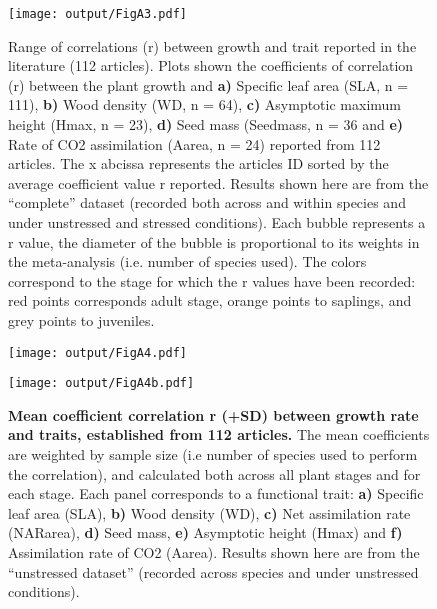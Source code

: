 \documentclass[a4paper]{article}\usepackage[]{graphicx}\usepackage[]{color}
\begin{document}
\begin{appendices}
\begin{figure}[h!]
\centering
\texttt{[image: output/FigA3.pdf]}
\caption{Range of correlations (r) between
growth and trait reported in the literature (112 articles). Plots shown the coefficients of correlation (r)
between the plant growth and \textbf{a)} Specific leaf area (SLA, n =
111), \textbf{b)} Wood density (WD, n = 64), \textbf{c)} Asymptotic
maximum height (Hmax, n = 23), \textbf{d)} Seed mass (Seedmass, n = 36 and
\textbf{e)} Rate of CO2 assimilation (Aarea, n = 24) reported from 112
articles. The x abcissa represents the articles ID sorted by the average coefficient value r reported.
Results shown here are from the ``complete'' dataset (recorded both across and within species
and under unstressed and stressed conditions). Each bubble represents a r value, the diameter of the bubble
is proportional to its weights in the meta-analysis (i.e. number of species used). The colors
correspond to the stage for which the r values have been recorded: red
points corresponds adult stage, orange points to saplings, and grey
points to juveniles.}
\label{fig:figA3}
\end{figure}

\begin{figure}[h!]
\centering
\texttt{[image: output/FigA4.pdf]}
\end{figure}

\begin{figure}[h!]
\centering
\texttt{[image: output/FigA4b.pdf]}
\caption{\textbf{Mean coefficient correlation r (+SD) between growth rate and traits, established from 112 articles.} The mean coefficients are weighted by sample size (i.e number of species used to perform the correlation), and calculated both across all plant stages and for each stage. Each panel corresponds to a functional trait: \textbf{a)} Specific leaf area (SLA), \textbf{b)} Wood density (WD), \textbf{c)} Net assimilation rate (NARarea), \textbf{d)} Seed mass, \textbf{e)} Asymptotic height (Hmax) and \textbf{f)} Assimilation rate of CO2 (Aarea). Results shown here are from the ``unstressed dataset'' (recorded across species and under unstressed conditions).}
\label{fig:figA4}
\end{figure}


\end{appendices}
\end{document}
